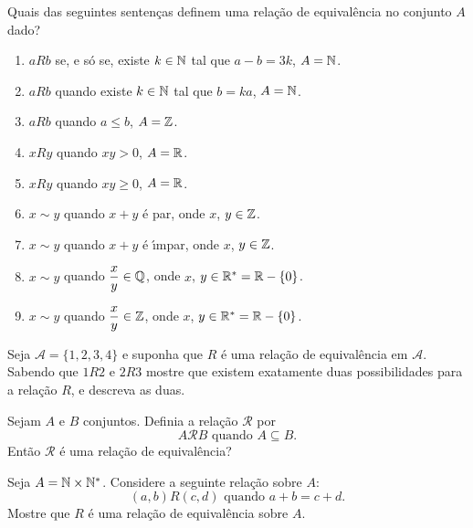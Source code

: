 \documentclass[12pt]{exam}
\begin{document}
    \vspace{.3cm}

    \questao{} Quais das seguintes senten{\c c}as definem uma rela{\c c}{\~a}o de equival{\^e}ncia no conjunto $A$ dado?
    \begin{enumerate}[label={\alph*})]
        \item $aRb$ se, e s{\'o} se, existe $k \in \mathbb{N}$ tal que $a - b = 3k$, $A = \mathbb{N}$.

        \item $aRb$ quando existe $k \in \mathbb{N}$ tal que $b = k a$, $A = \mathbb{N}$.

        \item $aRb$ quando $a \le b$, $A = \mathbb{Z}$.

        \item $xRy$ quando $xy > 0$, $ A = \mathbb{R}$.

        \item $xRy$ quando $xy \ge 0$, $ A = \mathbb{R}$.

        \item $x \sim y$ quando $x + y$ \'e par, onde $x$, $y \in \mathbb{Z}$.

        \item $x \sim y$ quando $x + y$ \'e {\'\i}mpar, onde $x$, $y \in \mathbb{Z}$.

        \item $x \sim y$ quando $\dfrac{x}{y} \in \mathbb{Q}$, onde $x$, $y \in \mathbb{R}^* = \mathbb{R} - \{0\}$.

        \item $x \sim y$ quando $\dfrac{x}{y} \in \mathbb{Z}$, onde $x$, $y \in \mathbb{R}^* = \mathbb{R} - \{0\}$.
    \end{enumerate}

    \vspace{.3cm}

    \questao{} Seja $\mathcal{A} = \{1,2,3,4\}$ e suponha que $R$ \'e uma rela\c{c}\~ao de equival\^encia em $\mathcal{A}$. Sabendo que $1R2$ e $2R3$ mostre que existem exatamente duas possibilidades para a rela\c{c}\~ao $R$, e descreva as duas.

    \vspace{.3cm}

    \questao{} Sejam $A$ e $B$ conjuntos. Definia a rela{\c c}\~ao $\mathcal{R}$ por
    \[
        A \mathcal{R} B \mbox{ quando } A \subseteq B.
    \]
    Ent\~ao $\mathcal{R}$ \'e uma rela{\c c}\~ao de equival\^encia?

    \vspace{.3cm}

    \questao{} Seja $A = \mathbb{N} \times \mathbb{N}^*$. Considere a seguinte
    rela{\c c}{\~a}o sobre $A$:
    \[
        (a,b) R (c,d) \mbox{ quando } a + b = c + d.
    \]
    Mostre que $R$ {\'e} uma rela{\c c}{\~a}o de equival{\^e}ncia sobre $A$.
\end{document}
